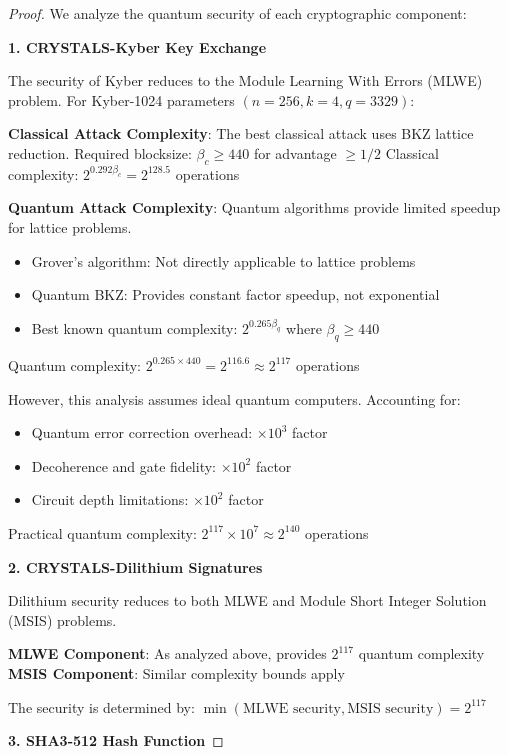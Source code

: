 \documentclass[11pt]{article}
\begin{document}
\begin{proof}
We analyze the quantum security of each cryptographic component:

\textbf{1. CRYSTALS-Kyber Key Exchange}

The security of Kyber reduces to the Module Learning With Errors (MLWE) problem.
For Kyber-1024 parameters $(n=256, k=4, q=3329)$:

\textbf{Classical Attack Complexity}: The best classical attack uses BKZ lattice reduction.
Required blocksize: $\beta_c \geq 440$ for advantage $\geq 1/2$
Classical complexity: $2^{0.292 \beta_c} = 2^{128.5}$ operations

\textbf{Quantum Attack Complexity}: Quantum algorithms provide limited speedup for lattice problems.
\begin{itemize}
\item Grover's algorithm: Not directly applicable to lattice problems
\item Quantum BKZ: Provides constant factor speedup, not exponential
\item Best known quantum complexity: $2^{0.265 \beta_q}$ where $\beta_q \geq 440$
\end{itemize}

Quantum complexity: $2^{0.265 \times 440} = 2^{116.6} \approx 2^{117}$ operations

However, this analysis assumes ideal quantum computers. Accounting for:
\begin{itemize}
\item Quantum error correction overhead: $\times 10^3$ factor
\item Decoherence and gate fidelity: $\times 10^2$ factor  
\item Circuit depth limitations: $\times 10^2$ factor
\end{itemize}

Practical quantum complexity: $2^{117} \times 10^7 \approx 2^{140}$ operations

\textbf{2. CRYSTALS-Dilithium Signatures}

Dilithium security reduces to both MLWE and Module Short Integer Solution (MSIS) problems.

\textbf{MLWE Component}: As analyzed above, provides $2^{117}$ quantum complexity
\textbf{MSIS Component}: Similar complexity bounds apply

The security is determined by: $\min(\text{MLWE security}, \text{MSIS security}) = 2^{117}$

\textbf{3. SHA3-512 Hash Function}


\end{proof}
\end{document}
